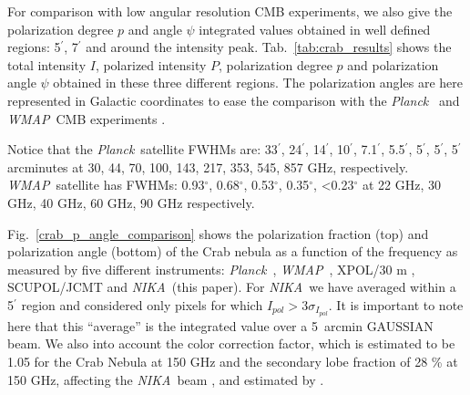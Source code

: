 \documentclass[twocolumn,traditabstract]{aa}
\def\NIKA{\textit{NIKA}}
\def\Planck{\textit{Planck}}
\def\WMAP{\textit{WMAP}}
\begin{document}
For comparison with low angular resolution CMB experiments, we also give the
polarization degree $p$ and angle $\psi$ integrated values obtained in well
defined regions: 5$^\prime$, 7$^\prime$ and around the intensity peak.
Tab.~\ref{tab:crab_results} shows the total intensity $I$, polarized intensity
$P$, polarization degree $p$ and polarization angle $\psi$ obtained in these three different regions.
The polarization angles are here represented in Galactic coordinates to ease the comparison with the \Planck\ \citep{2015arXiv150702058P} and \WMAP\ CMB experiments \citep{2011ApJS..192...19W}. 

Notice that the \Planck\ satellite FWHMs are: 33$^{\prime}$, 24$^{\prime}$, 14$^{\prime}$, 10$^{\prime}$, 7.1$^{\prime}$, 5.5$^{\prime}$, 5$^{\prime}$, 5$^{\prime}$, 5$^{\prime}$ arcminutes at 30, 44, 70, 100, 143, 217, 353, 545, 857 GHz, respectively.
\WMAP\ satellite has FWHMs: 0.93$^{\circ}$, 0.68$^{\circ}$, 0.53$^{\circ}$, 0.35$^{\circ}$, \textless 0.23$^{\circ}$ at 22 GHz, 30 GHz, 40 GHz, 60 GHz, 90 GHz respectively. 

Fig.~\ref{crab_p_angle_comparison} shows the polarization fraction (top) and polarization angle (bottom) of the Crab nebula as a function of the frequency as measured by
five different instruments: \Planck\ \citep{2015arXiv150702058P},
\WMAP\ \citep{2011ApJS..192...19W}, XPOL/30 m \citep{aumont2010}, SCUPOL/JCMT 
\citep{scubapol} and \NIKA\ (this paper).  For \NIKA\ we have averaged within a
5$^\prime$ region and considered only pixels for which $I_{pol} > 3\sigma_{I_{pol}}$. It is important to note here that this ``average'' is the
  integrated value over a 5~arcmin GAUSSIAN beam.
  We also into account the color correction factor, which is estimated to be 1.05 for the Crab Nebula at 150 GHz and the secondary lobe fraction of 28 \% at 150 GHz, affecting the \NIKA\ beam \citep{catalano2014}, and estimated by \cite{adam:tel-01303736}.
\end{document}
